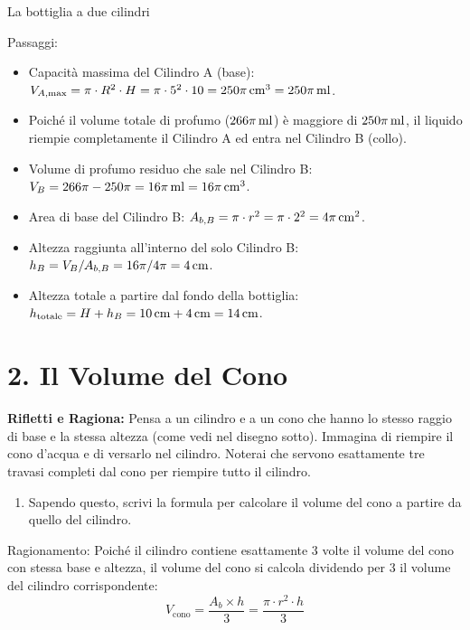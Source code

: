 \begin{esercizio}{La bottiglia a due cilindri}
\begin{soluzione}
  Passaggi:
  \begin{itemize}
    \item Capacità massima del Cilindro A (base): $V_{A,\text{max}} = \pi \cdot R^2 \cdot H = \pi \cdot 5^2 \cdot 10 = 250\pi\,\mathrm{cm^3} = 250\pi\,\mathrm{ml}$.
    \item Poiché il volume totale di profumo ($266\pi\,\mathrm{ml}$) è maggiore di $250\pi\,\mathrm{ml}$, il liquido riempie completamente il Cilindro A ed entra nel Cilindro B (collo).
    \item Volume di profumo residuo che sale nel Cilindro B: $V_B = 266\pi - 250\pi = 16\pi\,\mathrm{ml} = 16\pi\,\mathrm{cm^3}$.
    \item Area di base del Cilindro B: $A_{b,B} = \pi \cdot r^2 = \pi \cdot 2^2 = 4\pi\,\mathrm{cm^2}$.
    \item Altezza raggiunta all'interno del solo Cilindro B: $h_B = V_B / A_{b,B} = 16\pi / 4\pi = 4\,\mathrm{cm}$.
    \item Altezza totale a partire dal fondo della bottiglia: $h_{\text{totale}} = H + h_B = 10\,\mathrm{cm} + 4\,\mathrm{cm} = 14\,\mathrm{cm}$.
  \end{itemize}
\end{soluzione}
\end{esercizio}

\condnewpage

\section*{2. Il Volume del Cono}

\textbf{Rifletti e Ragiona:}
Pensa a un cilindro e a un cono che hanno lo stesso raggio di base e la stessa altezza (come vedi nel disegno sotto). Immagina di riempire il cono d'acqua e di versarlo nel cilindro. Noterai che servono esattamente tre travasi completi dal cono per riempire tutto il cilindro.

\begin{enumerate}[label=\alph*)]
  \item Sapendo questo, scrivi la formula per calcolare il volume del cono a partire da quello del cilindro.
\end{enumerate}

\responsespace{3cm}

\begin{soluzione}
  Ragionamento:
  Poiché il cilindro contiene esattamente 3 volte il volume del cono con stessa base e altezza, il volume del cono si calcola dividendo per 3 il volume del cilindro corrispondente:
  \[
  V_{\text{cono}} = \frac{A_b \times h}{3} = \frac{\pi \cdot r^2 \cdot h}{3}
  \]
\end{soluzione}

